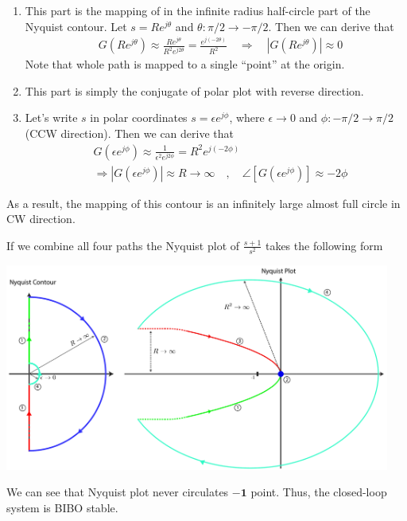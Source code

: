 \documentclass{article}
\begin{document}
\begin{enumerate}
  \item This part is the mapping of in the infinite radius half-circle part of the Nyquist contour.
    Let $s = R e^{j \theta}$ and $\theta : \pi/2 \to -\pi/2$.  Then 
   we can derive that  
   \begin{align*}
     & G \left( R e^{j \theta} \right) \approx \frac{R e^{j \theta}}{R^2 e^{j 2 \theta}} = \frac{e^{j (-2 \theta)}}{R^2}
    \quad 
    \Rightarrow \quad | G \left( R e^{j \theta} \right) | \approx 0
   \end{align*}
   Note that whole path is mapped to a single ``point'' at the origin. 
   \item This part is simply the conjugate of polar plot with reverse
     direction. 
  \item Let's write $s$ in polar coordinates
     $s = \epsilon e^{j \phi}$, where $\epsilon \to 0$ and $\phi :
     -\pi/2 \to \pi/2$ (CCW direction).  Then  we can derive that  
   \begin{align*}
     & G \left( \epsilon e^{j \phi} \right) \approx \frac{1}{\epsilon^2 e^{j 2 \phi}} = R^2 e^{j (-2 \phi)}
       \\
    &\Rightarrow | G \left(\epsilon e^{j \phi} \right) | \approx
     R \to \infty 
   \quad , \quad \angle [ G \left( \epsilon e^{j \phi} \right) ] \approx -2 \phi
   \end{align*}
\end{enumerate}

As a result, the mapping of this contour is an infinitely large almost full circle in CW direction. 

If we combine all four paths the Nyquist plot of $ \frac{s+1}{s^2}$ takes the following form

\vspace{6 pt}

  \begin{minipage}[h]{1\linewidth}
    \begin{center}
      \includegraphics[width=0.95\textwidth]{figs/doubleint}
    \end{center}
  \end{minipage}

\vspace{6 pt}

We can see that Nyquist plot never circulates $\mathbf{-1}$ point.
Thus, the closed-loop system is BIBO stable.

 
\end{document}
